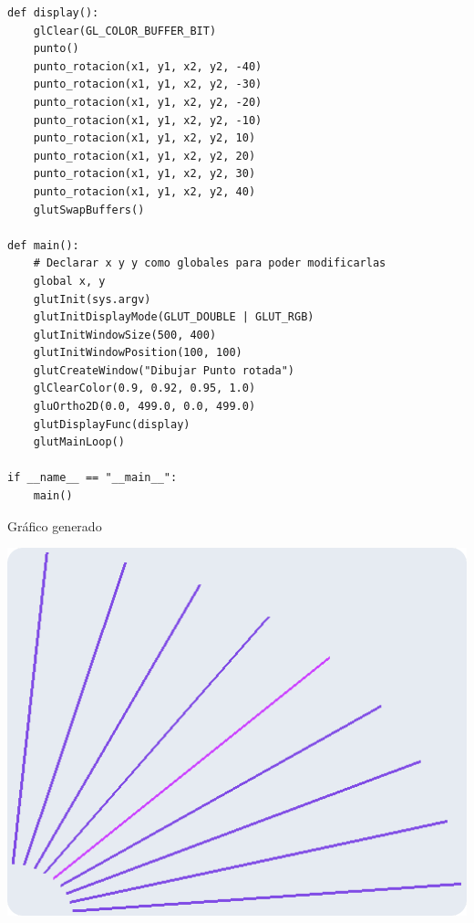 \documentclass[a4paper]{article}
\begin{document}
\begin{center}
\begin{mycodebox}
\begin{lstlisting}
def display():
    glClear(GL_COLOR_BUFFER_BIT)
    punto()
    punto_rotacion(x1, y1, x2, y2, -40)
    punto_rotacion(x1, y1, x2, y2, -30)
    punto_rotacion(x1, y1, x2, y2, -20)
    punto_rotacion(x1, y1, x2, y2, -10)
    punto_rotacion(x1, y1, x2, y2, 10)
    punto_rotacion(x1, y1, x2, y2, 20)
    punto_rotacion(x1, y1, x2, y2, 30)
    punto_rotacion(x1, y1, x2, y2, 40)
    glutSwapBuffers()

def main():
    # Declarar x y y como globales para poder modificarlas
    global x, y  
    glutInit(sys.argv)
    glutInitDisplayMode(GLUT_DOUBLE | GLUT_RGB)
    glutInitWindowSize(500, 400)
    glutInitWindowPosition(100, 100)
    glutCreateWindow("Dibujar Punto rotada")
    glClearColor(0.9, 0.92, 0.95, 1.0)
    gluOrtho2D(0.0, 499.0, 0.0, 499.0)
    glutDisplayFunc(display)
    glutMainLoop()

if __name__ == "__main__":
    main()
\end{lstlisting}
\end{mycodebox}
\end{center}
\newpage
Gráfico generado\\
\begin{center}
\includegraphics[width=16cm]{src/3.png}
\end{center}
\newpage
\end{document}
